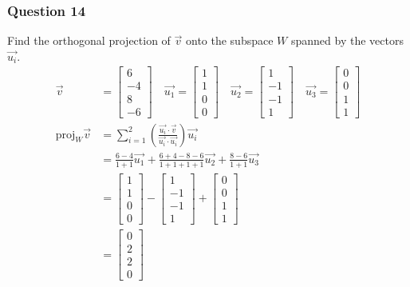\documentclass{math}
\begin{document}
\subsubsection*{Question 14}
Find the orthogonal projection of \( \vec{v} \) onto the subspace \( W \)
spanned by the vectors \( \vec{u_i} \).
\begin{align*}
  \vec{v} &= \begin{bmatrix}6 \\ -4 \\ 8 \\ -6\end{bmatrix} \quad
    \vec{u_1} = \begin{bmatrix}1 \\ 1 \\ 0 \\ 0\end{bmatrix} \quad
    \vec{u_2} = \begin{bmatrix}1 \\ -1 \\ -1 \\ 1\end{bmatrix} \quad
    \vec{u_3} = \begin{bmatrix}0 \\ 0 \\ 1 \\ 1\end{bmatrix} \\
  \text{proj}_{W}\vec{v} &= \sum_{i=1}^{2}
    \left(\frac{\vec{u_i}\cdot\vec{v}}{\vec{u_i}\cdot\vec{u_i}}\right)
    \vec{u_i} \\
  &= \frac{6-4}{1+1}\vec{u_1}+\frac{6+4-8-6}{1+1+1+1}\vec{u_2}+
    \frac{8-6}{1+1}\vec{u_3} \\
  &= \begin{bmatrix}1 \\ 1 \\ 0 \\ 0\end{bmatrix}-
    \begin{bmatrix}1 \\ -1 \\ -1 \\ 1\end{bmatrix}+
    \begin{bmatrix}0 \\ 0 \\ 1 \\ 1\end{bmatrix} \\
  &= \begin{bmatrix}0 \\ 2 \\ 2 \\ 0\end{bmatrix}
\end{align*}
\end{document}
